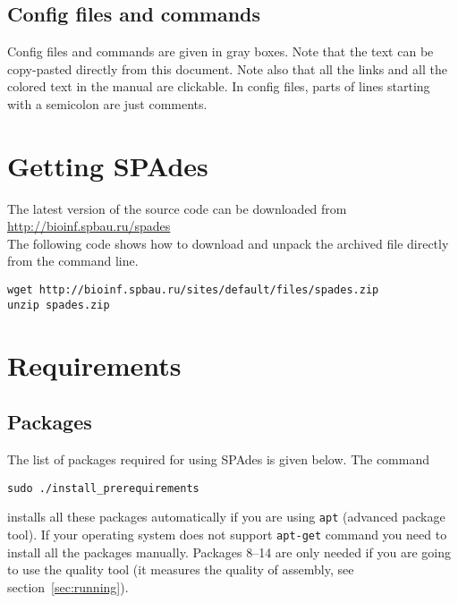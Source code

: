 \documentclass{article}
\def\spades{SPAdes}
\begin{document}
\subsection{Config files and commands}
Config files and commands are given in gray boxes. 
Note that the text can be copy-pasted directly from this document.
Note also that all the links and all the colored text in the manual are clickable.
In config files, parts of lines starting with a semicolon are just comments.


\section{Getting {\spades}}
The latest version of the source code can be downloaded from\\
\url{http://bioinf.spbau.ru/spades}\\
The following code shows how to download and unpack the archived file
directly from the command line.

\begin{lstlisting}
wget http://bioinf.spbau.ru/sites/default/files/spades.zip
unzip spades.zip
\end{lstlisting}

\section{Requirements}\label{section:requirements}
\subsection{Packages}\label{subsection:packages}
The list of packages required for using {\spades} is given below.
The command
\begin{lstlisting}
sudo ./install_prerequirements
\end{lstlisting}
installs all these packages automatically if you are using {\tt apt} (advanced package tool).
If your operating system does not support {\tt apt-get} command you
need to install all the packages manually. Packages 8--14 are only needed if you are going
to use the quality tool (it measures the quality of assembly, see section~\ref{sec:running}).
\end{document}
